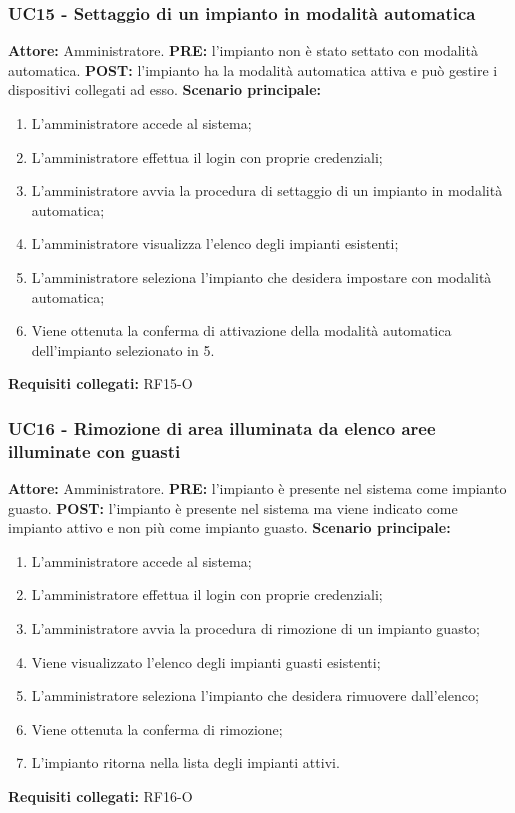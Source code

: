 \documentclass[a4paper, 12pt]{article}
\begin{document}
\subsubsection{UC15 - Settaggio di un impianto in modalità automatica}
\textbf{Attore:} Amministratore.\newline
\textbf{PRE:} l'impianto non è stato settato con modalità automatica.\newline
\textbf{POST:} l'impianto ha la modalità automatica attiva e può gestire i dispositivi collegati ad esso.\newline
\textbf{Scenario principale:}
\begin{enumerate}
    \item L'amministratore accede al sistema;
    \item L'amministratore effettua il login con proprie credenziali;
    \item L'amministratore avvia la procedura di settaggio di un impianto in modalità automatica;
    \item L'amministratore visualizza l'elenco degli impianti esistenti;
    \item L'amministratore seleziona l'impianto che desidera impostare con modalità automatica;
    \item Viene ottenuta la conferma di attivazione della modalità automatica dell'impianto selezionato in 5.
\end{enumerate}
\textbf{Requisiti collegati:} RF15-O\newline

\subsubsection{UC16 - Rimozione di area illuminata da elenco aree illuminate con guasti}
\textbf{Attore:} Amministratore.\newline
\textbf{PRE:} l'impianto è presente nel sistema come impianto guasto.\newline
\textbf{POST:} l'impianto è presente nel sistema ma viene indicato come impianto attivo e non più come impianto guasto.\newline
\textbf{Scenario principale:}
\begin{enumerate}
    \item L'amministratore accede al sistema;
    \item L'amministratore effettua il login con proprie credenziali;
    \item L'amministratore avvia la procedura di rimozione di un impianto guasto;
    \item Viene visualizzato l'elenco degli impianti guasti esistenti;
    \item L'amministratore seleziona l'impianto che desidera rimuovere dall'elenco;
    \item Viene ottenuta la conferma di rimozione;
    \item L'impianto ritorna nella lista degli impianti attivi.
\end{enumerate}
\textbf{Requisiti collegati:} RF16-O\newline
\end{document}
